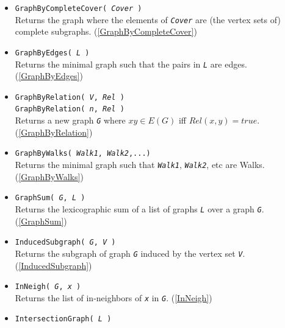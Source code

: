 \documentclass[a4paper,11pt]{report}
\begin{document}
{{\begin{itemize}
 Returns a new graph created from an adjacency matrix \mbox{\texttt{\mdseries\slshape Mat}}. (\ref{GraphByAdjMatrix}) 
\item \texttt{GraphByCompleteCover( \mbox{\texttt{\mdseries\slshape Cover}} )}\\
 Returns the graph where the elements of \mbox{\texttt{\mdseries\slshape Cover}} are (the vertex sets of) complete subgraphs. (\ref{GraphByCompleteCover}) 
\item \texttt{GraphByEdges( \mbox{\texttt{\mdseries\slshape L}} )}\\
 Returns the minimal graph such that the pairs in \mbox{\texttt{\mdseries\slshape L}} are edges. (\ref{GraphByEdges}) 
\item \texttt{GraphByRelation( \mbox{\texttt{\mdseries\slshape V}}, \mbox{\texttt{\mdseries\slshape Rel}} )}\\
 \texttt{GraphByRelation( \mbox{\texttt{\mdseries\slshape n}}, \mbox{\texttt{\mdseries\slshape Rel}} )}\\
 Returns a new graph \mbox{\texttt{\mdseries\slshape G}} where $xy \in E(G)$ iff $Rel(x,y)=true$. (\ref{GraphByRelation}) 
\item \texttt{GraphByWalks( \mbox{\texttt{\mdseries\slshape Walk1}}, \mbox{\texttt{\mdseries\slshape Walk2}},...)}\\
 Returns the minimal graph such that \mbox{\texttt{\mdseries\slshape Walk1}}, \mbox{\texttt{\mdseries\slshape Walk2}}, etc are Walks. (\ref{GraphByWalks}) 
\item \texttt{GraphSum( \mbox{\texttt{\mdseries\slshape G}}, \mbox{\texttt{\mdseries\slshape L}} )}\\
 Returns the lexicographic sum of a list of graphs \mbox{\texttt{\mdseries\slshape L}} over a graph \mbox{\texttt{\mdseries\slshape G}}. (\ref{GraphSum}) 
\item \texttt{InducedSubgraph( \mbox{\texttt{\mdseries\slshape G}}, \mbox{\texttt{\mdseries\slshape V}} )}\\
 Returns the subgraph of graph \mbox{\texttt{\mdseries\slshape G}} induced by the vertex set \mbox{\texttt{\mdseries\slshape V}}. (\ref{InducedSubgraph}) 
\item \texttt{InNeigh( \mbox{\texttt{\mdseries\slshape G}}, \mbox{\texttt{\mdseries\slshape x}} )}\\
 Returns the list of in-neighbors of \mbox{\texttt{\mdseries\slshape x}} in \mbox{\texttt{\mdseries\slshape G}}. (\ref{InNeigh}) 
\item \texttt{IntersectionGraph( \mbox{\texttt{\mdseries\slshape L}} )}\\

\end{itemize}}}
\end{document}
